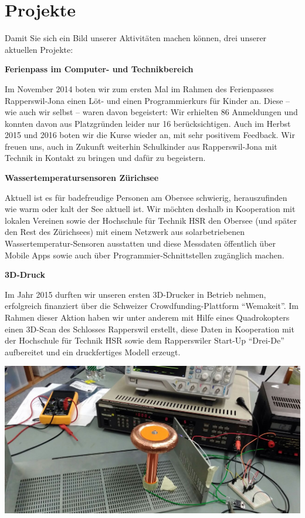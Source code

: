\documentclass[10pt,a4paper,parskip,fleqn]{scrartcl}
\begin{document}
\section{Projekte}

Damit Sie sich ein Bild unserer Aktivitäten machen können, drei unserer
aktuellen Projekte:

\textbf{Ferienpass im Computer- und Technikbereich}

Im November 2014 boten wir zum ersten Mal im Rahmen des Ferienpasses
Rapperswil-Jona einen Löt- und einen Programmierkurs für Kinder an. Diese -- wie
auch wir selbst -- waren davon begeistert: Wir erhielten 86 Anmeldungen und
konnten davon aus Platzgründen leider nur 16 berücksichtigen. Auch im Herbst
2015 und 2016 boten wir die Kurse wieder an, mit sehr positivem Feedback. Wir
freuen uns, auch in Zukunft weiterhin Schulkinder aus Rapperswil-Jona mit
Technik in Kontakt zu bringen und dafür zu begeistern.

\textbf{Wassertemperatursensoren Zürichsee}

Aktuell ist es für badefreudige Personen am Obersee schwierig, herauszufinden
wie warm oder kalt der See aktuell ist. Wir möchten deshalb in Kooperation mit
lokalen Vereinen sowie der Hochschule für Technik HSR den Obersee (und später
den Rest des Zürichsees) mit einem Netzwerk aus solarbetriebenen
Wassertemperatur-Sensoren ausstatten und diese Messdaten öffentlich über Mobile
Apps sowie auch über Programmier-Schnittstellen zugänglich machen.

\textbf{3D-Druck}

Im Jahr 2015 durften wir unseren ersten 3D-Drucker in Betrieb nehmen,
erfolgreich finanziert über die Schweizer Crowdfunding-Plattform ``Wemakeit''.
Im Rahmen dieser Aktion haben wir unter anderem mit Hilfe eines Quadrokopters
einen 3D-Scan des Schlosses Rapperswil erstellt, diese Daten in Kooperation mit
der Hochschule für Technik HSR sowie dem Rapperswiler Start-Up ``Drei-De''
aufbereitet und ein druckfertiges Modell erzeugt.

\includegraphics[width=\textwidth]{img/tesla.jpg}
\end{document}
